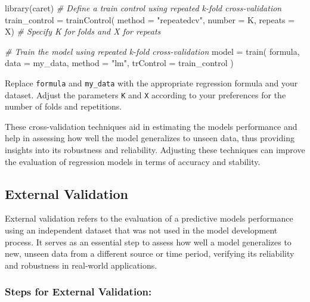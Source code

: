 \documentclass[
]{article}
\newenvironment{Shaded}{}{}
\newcommand{\AttributeTok}[1]{\textcolor[rgb]{0.49,0.56,0.16}{#1}}
\newcommand{\CommentTok}[1]{\textcolor[rgb]{0.38,0.63,0.69}{\textit{#1}}}
\newcommand{\FunctionTok}[1]{\textcolor[rgb]{0.02,0.16,0.49}{#1}}
\newcommand{\NormalTok}[1]{#1}
\newcommand{\OtherTok}[1]{\textcolor[rgb]{0.00,0.44,0.13}{#1}}
\newcommand{\StringTok}[1]{\textcolor[rgb]{0.25,0.44,0.63}{#1}}
\begin{document}
\begin{Shaded}
\begin{Highlighting}[]
\FunctionTok{library}\NormalTok{(caret)}
\CommentTok{\# Define a train control using repeated k{-}fold cross{-}validation}
\NormalTok{train\_control }\OtherTok{=}
\FunctionTok{trainControl}\NormalTok{(}
  \AttributeTok{method =} \StringTok{"repeatedcv"}\NormalTok{,}
  \AttributeTok{number =}\NormalTok{ K, }\AttributeTok{repeats =}\NormalTok{ X) }
\CommentTok{\# Specify K for folds and X for repeats}

\CommentTok{\# Train the model using repeated k{-}fold cross{-}validation}
\NormalTok{model }\OtherTok{=}
	\FunctionTok{train}\NormalTok{(}
\NormalTok{    formula,}
    \AttributeTok{data =}\NormalTok{ my\_data,}
    \AttributeTok{method =} \StringTok{"lm"}\NormalTok{,}
    \AttributeTok{trControl =}\NormalTok{ train\_control}
\NormalTok{  )}
\end{Highlighting}
\end{Shaded}

Replace \texttt{formula} and \texttt{my\_data} with the appropriate
regression formula and your dataset. Adjust the parameters \texttt{K}
and \texttt{X} according to your preferences for the number of folds and
repetitions.

These cross-validation techniques aid in estimating the
model\textquotesingle s performance and help in assessing how well the
model generalizes to unseen data, thus providing insights into its
robustness and reliability. Adjusting these techniques can improve the
evaluation of regression models in terms of accuracy and stability.

\hypertarget{external-validation}{%
\subsection{External Validation}\label{external-validation}}

External validation refers to the evaluation of a predictive
model\textquotesingle s performance using an independent dataset that
was not used in the model development process. It serves as an essential
step to assess how well a model generalizes to new, unseen data from a
different source or time period, verifying its reliability and
robustness in real-world applications.

\hypertarget{steps-for-external-validation}{%
\subsubsection{Steps for External
Validation:}\label{steps-for-external-validation}}
\end{document}
